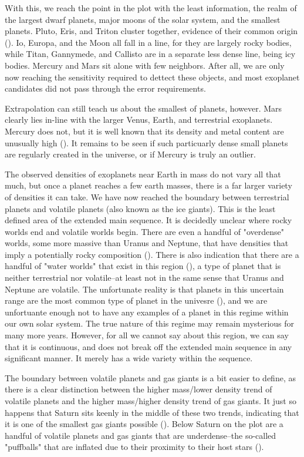 \documentclass[twocolumn,linenumbers]{aastex631}
\begin{document}
With this, we reach the point in the plot with the least information, the realm of the largest dwarf planets, major moons of the solar system, and the smallest planets. Pluto, Eris, and Triton cluster together, evidence of their common origin (). Io, Europa, and the Moon all fall in a line, for they are largely rocky bodies, while Titan, Gannymede, and Callisto are in a separate less dense line, being icy bodies. Mercury and Mars sit alone with few neighbors. After all, we are only now reaching the sensitivity required to dettect these objects, and most exoplanet candidates did not pass through the error requirements. 

Extrapolation can still teach us about the smallest of planets, however. Mars clearly lies in-line with the larger Venus, Earth, and terrestrial exoplanets. Mercury does not, but it is well known that its density and metal content are unusually high (). It remains to be seen if such particuarly dense small planets are regularly created in the universe, or if Mercury is truly an outlier. 

The observed densities of exoplanets near Earth in mass do not vary all that much, but once a planet reaches a few earth masses, there is a far larger variety of densities it can take. We have now reached the boundary between terrestrial planets and volatile planets (also known as the ice giants). This is the least defined area of the extended main sequence. It is decidedly unclear where rocky worlds end and volatile worlds begin. There are even a handful of "overdense" worlds, some more massive than Uranus and Neptune, that have densities that imply a potentially rocky composition (). There is also indication that there are a handful of "water worlds" that exist in this region (), a type of planet that is neither terrestrial nor volatile--at least not in the same sense that Uranus and Neptune are volatile. The unfortunate reality is that planets in this uncertain range are the most common type of planet in the univesre (), and we are unfortuante enough not to have any examples of a planet in this regime within our own solar system. The true nature of this regime may remain mysterious for many more years. However, for all we cannot say about this region, we can say that it is continuous, and does not break off the extended main sequence in any significant manner. It merely has a wide variety within the sequence. 

The boundary between volatile planets and gas giants is a bit easier to define, as there is a clear distinction between the higher mass/lower density trend of volatile planets and the higher mass/higher density trend of gas giants. It just so happens that Saturn sits keenly in the middle of these two trends, indicating that it is one of the smallest gas giants possible (). Below Saturn on the plot are a handful of volatile planets and gas giants that are underdense--the so-called "puffballs" that are inflated due to their proximity to their host stars (). 
\end{document}
